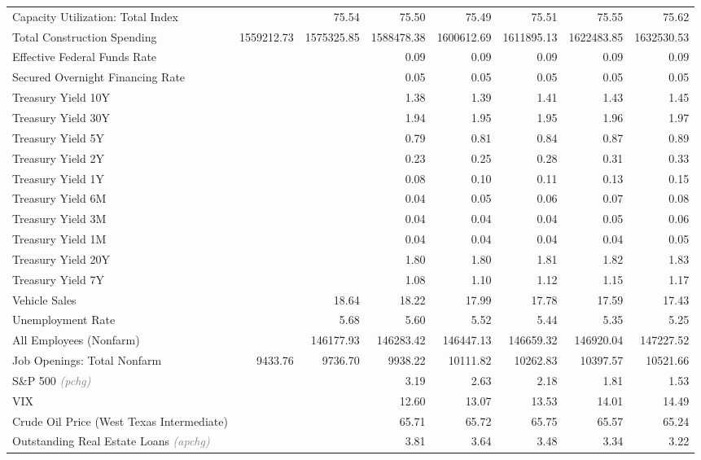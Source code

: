 \documentclass[11pt, letterpaper]{article}\usepackage[]{graphicx}\usepackage[]{color}
\begin{document}
\begin{table}[H]
\begin{tabular}{lrrrrrrr}
  Capacity Utilization: Total Index &  & 75.54 & 75.50 & 75.49 & 75.51 & 75.55 & 75.62 \\ 
  Total Construction Spending & 1559212.73 & 1575325.85 & 1588478.38 & 1600612.69 & 1611895.13 & 1622483.85 & 1632530.53 \\ 
  Effective Federal Funds Rate &  &  & 0.09 & 0.09 & 0.09 & 0.09 & 0.09 \\ 
  Secured Overnight Financing Rate &  &  & 0.05 & 0.05 & 0.05 & 0.05 & 0.05 \\ 
  Treasury Yield 10Y &  &  & 1.38 & 1.39 & 1.41 & 1.43 & 1.45 \\ 
  Treasury Yield 30Y &  &  & 1.94 & 1.95 & 1.95 & 1.96 & 1.97 \\ 
  Treasury Yield 5Y &  &  & 0.79 & 0.81 & 0.84 & 0.87 & 0.89 \\ 
  Treasury Yield 2Y &  &  & 0.23 & 0.25 & 0.28 & 0.31 & 0.33 \\ 
  Treasury Yield 1Y &  &  & 0.08 & 0.10 & 0.11 & 0.13 & 0.15 \\ 
  Treasury Yield 6M &  &  & 0.04 & 0.05 & 0.06 & 0.07 & 0.08 \\ 
  Treasury Yield 3M &  &  & 0.04 & 0.04 & 0.04 & 0.05 & 0.06 \\ 
  Treasury Yield 1M &  &  & 0.04 & 0.04 & 0.04 & 0.04 & 0.05 \\ 
  Treasury Yield 20Y &  &  & 1.80 & 1.80 & 1.81 & 1.82 & 1.83 \\ 
  Treasury Yield 7Y &  &  & 1.08 & 1.10 & 1.12 & 1.15 & 1.17 \\ 
  Vehicle Sales &  & 18.64 & 18.22 & 17.99 & 17.78 & 17.59 & 17.43 \\ 
  Unemployment Rate &  & 5.68 & 5.60 & 5.52 & 5.44 & 5.35 & 5.25 \\ 
  All Employees (Nonfarm) &  & 146177.93 & 146283.42 & 146447.13 & 146659.32 & 146920.04 & 147227.52 \\ 
  Job Openings: Total Nonfarm & 9433.76 & 9736.70 & 9938.22 & 10111.82 & 10262.83 & 10397.57 & 10521.66 \\ 
  S\&P 500 \textit{\footnotesize\textcolor{gray}{(pchg)}} &  &  & 3.19 & 2.63 & 2.18 & 1.81 & 1.53 \\ 
  VIX &  &  & 12.60 & 13.07 & 13.53 & 14.01 & 14.49 \\ 
  Crude Oil Price (West Texas Intermediate) &  &  & 65.71 & 65.72 & 65.75 & 65.57 & 65.24 \\ 
  Outstanding Real Estate Loans \textit{\footnotesize\textcolor{gray}{(apchg)}} &  &  & 3.81 & 3.64 & 3.48 & 3.34 & 3.22 \\ 

\end{tabular}
\end{table}
\end{document}
